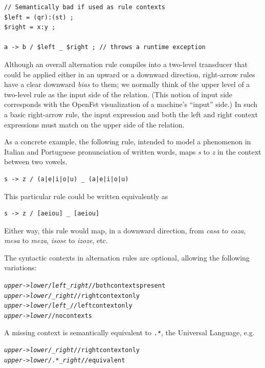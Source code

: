 \begin{Verbatim}
// Semantically bad if used as rule contexts
$left = (qr):(st) ;
$right = x:y ;

a -> b / $left _ $right ; // throws a runtime exception
\end{Verbatim}


Although an overall alternation rule compiles into a two-level transducer that could be applied either in an
upward or a downward direction, right-arrow rules have a clear downward \emph{bias} to them;
we normally think of the upper level of a two-level rule as the input side of the
relation.  (This notion of input side corresponds with the OpenFst visualization of a
machine's ``input'' side.)
In such a basic right-arrow rule, the input expression and both the left
and right context expressions must match on the upper side of the relation.

As a concrete example, the following rule, intended to model a phenomenon in Italian and Portuguese
pronunciation of written words, maps \emph{s} to \emph{z} in the context between two vowels.


\begin{Verbatim}
s -> z / (a|e|i|o|u) _ (a|e|i|o|u)
\end{Verbatim}

\noindent
This particular rule could be written equivalently as


\begin{Verbatim}
s -> z / [aeiou] _ [aeiou]
\end{Verbatim}

\noindent
Either way, this rule would map, in a downward direction, from \emph{casa} to \emph{caza}, \emph{mesa} to \emph{meza},
\emph{isose} to \emph{izoze}, etc.

The syntactic contexts in alternation rules are optional, allowing the following variations:

\begin{alltt}
\emph{upper} -> \emph{lower} /   \emph{left} _ \emph{right} // both contexts present
\emph{upper} -> \emph{lower} /   _ \emph{right}    // right context only
\emph{upper} -> \emph{lower} /   \emph{left} _     // left context only
\emph{upper} -> \emph{lower}               // no contexts
\end{alltt}

\noindent
A missing context is semantically equivalent to \verb!.*!, the Universal Language, e.g.

\begin{alltt}
\emph{upper} -> \emph{lower} /    _ \emph{right}	    // right context only
\emph{upper} -> \emph{lower} / .* _ \emph{right}	    // equivalent
\end{alltt}

